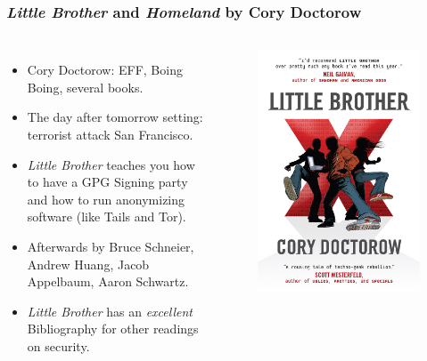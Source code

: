 \documentclass{beamer}
\begin{document}
\begin{frame}
\frametitle{\emph{Little Brother} and \emph{Homeland} by Cory
  Doctorow}

\begin{columns}[c] %
    \begin{itemize}
    \item Cory Doctorow: EFF, Boing Boing, several books.
    \item The day after tomorrow setting: terrorist attack San Francisco.
    \item \emph{Little Brother} teaches you how to have a GPG Signing
      party and how to run anonymizing software (like Tails and Tor).
    \item Afterwards by Bruce Schneier, Andrew Huang, Jacob Appelbaum,
      Aaron Schwartz.
    \item \emph{Little Brother} has an \emph{excellent} Bibliography for
      other readings on security.
    \end{itemize}


    \begin{figure}
    \includegraphics[width=\textwidth,height=0.8\textheight,keepaspectratio]{img/Little-Brother}


\end{figure}
\end{columns}
\end{frame}
\end{document}
